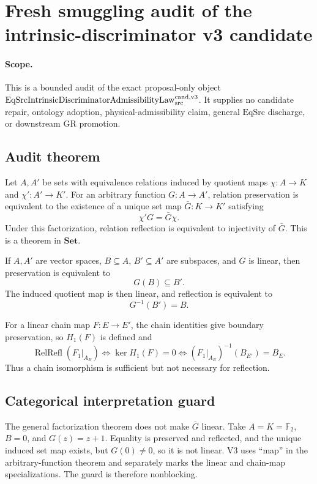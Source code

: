 \section{Fresh smuggling audit of the intrinsic-discriminator v3 candidate}

\paragraph{Scope.}
This is a bounded audit of the exact proposal-only object
\(\mathrm{EqSrcIntrinsicDiscriminatorAdmissibilityLaw}_{\rm src}^{\rm cand,v3}\).
It supplies no candidate repair, ontology adoption, physical-admissibility
claim, general \(\mathrm{EqSrc}\) discharge, or downstream GR promotion.

\subsection{Audit theorem}

Let \(A,A'\) be sets with equivalence relations induced by quotient maps
\(\chi:A\to K\) and \(\chi':A'\to K'\). For an arbitrary function
\(G:A\to A'\), relation preservation is equivalent to the existence of a
unique set map \(\bar G:K\to K'\) satisfying
\[
  \chi'G=\bar G\chi .
\]
Under this factorization, relation reflection is equivalent to injectivity of
\(\bar G\). This is a theorem in \(\mathbf{Set}\).

If \(A,A'\) are vector spaces, \(B\subseteq A\), \(B'\subseteq A'\) are
subspaces, and \(G\) is linear, then preservation is equivalent to
\[
  G(B)\subseteq B'.
\]
The induced quotient map is then linear, and reflection is equivalent to
\[
  G^{-1}(B')=B.
\]

For a linear chain map \(F:E\to E'\), the chain identities give boundary
preservation, so \(H_1(F)\) is defined and
\[
 \operatorname{RelRefl}(F_1|_{A_E})
 \iff \ker H_1(F)=0
 \iff (F_1|_{A_E})^{-1}(B_{E'})=B_E.
\]
Thus a chain isomorphism is sufficient but not necessary for reflection.

\subsection{Categorical interpretation guard}

The general factorization theorem does not make \(\bar G\) linear. Take
\(A=K=\mathbb F_2\), \(B=0\), and \(G(z)=z+1\). Equality is preserved and
reflected, and the unique induced set map exists, but \(G(0)\ne0\), so it is
not linear. V3 uses ``map'' in the arbitrary-function theorem and separately
marks the linear and chain-map specializations. The guard is therefore
nonblocking.

